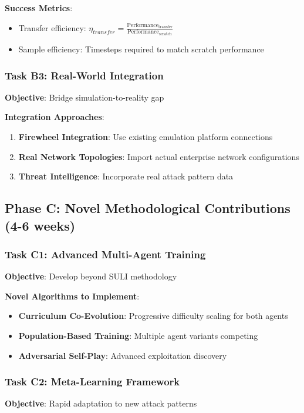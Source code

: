 \documentclass[11pt]{article}
\begin{document}
\textbf{Success Metrics}:
\begin{itemize}
\item Transfer efficiency: $\eta_{transfer} = \frac{\text{Performance}_{\text{transfer}}}{\text{Performance}_{\text{scratch}}}$
\item Sample efficiency: Timesteps required to match scratch performance
\end{itemize}

\subsubsection{Task B3: Real-World Integration}
\textbf{Objective}: Bridge simulation-to-reality gap

\textbf{Integration Approaches}:
\begin{enumerate}
\item \textbf{Firewheel Integration}: Use existing emulation platform connections
\item \textbf{Real Network Topologies}: Import actual enterprise network configurations
\item \textbf{Threat Intelligence}: Incorporate real attack pattern data
\end{enumerate}

\subsection{Phase C: Novel Methodological Contributions (4-6 weeks)}

\subsubsection{Task C1: Advanced Multi-Agent Training}
\textbf{Objective}: Develop beyond SULI methodology

\textbf{Novel Algorithms to Implement}:
\begin{itemize}
\item \textbf{Curriculum Co-Evolution}: Progressive difficulty scaling for both agents
\item \textbf{Population-Based Training}: Multiple agent variants competing
\item \textbf{Adversarial Self-Play}: Advanced exploitation discovery
\end{itemize}

\subsubsection{Task C2: Meta-Learning Framework}
\textbf{Objective}: Rapid adaptation to new attack patterns
\end{document}
